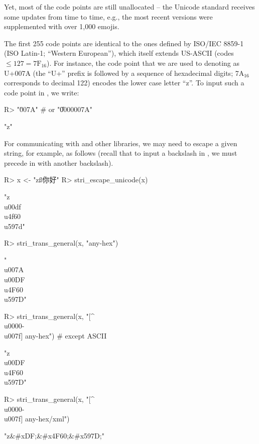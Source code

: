 \documentclass[nojss]{jss}\usepackage[]{graphicx}\usepackage[]{color}
\begin{document}
Yet, most of the code points are still unallocated -- the Unicode
standard receives some updates from time to time, e.g., the
most recent versions
were supplemented with over 1{,}000 emojis.


The first 255 code points are identical to the ones defined
by ISO/IEC 8859-1 (ISO Latin-1;
``Western European''), which itself extends US-ASCII (codes $\le 127=\text{7F}{}_{16}$).
For instance, the code point that we are used to denoting as U+007A
(the ``U+'' prefix is followed by a sequence of hexadecimal digits;
7A${}_{16}$ corresponds to decimal 122) encodes the lower case letter ``z''.
To input such a code point in , we write:

\begin{Schunk}
\begin{Sinput}
R> "\u007A"  # or "\U0000007A"
\end{Sinput}
\begin{Soutput}
[1] "z"
\end{Soutput}
\end{Schunk}


For communicating with  and other libraries,
we may need to escape a given string, for example, as follows
(recall that to input a backslash in ,
we must precede in with another backslash).

\begin{Schunk}
\begin{Sinput}
R> x <- "zß你好"
R> stri_escape_unicode(x)
\end{Sinput}
\begin{Soutput}
[1] "z\\u00df\\u4f60\\u597d"
\end{Soutput}
\begin{Sinput}
R> stri_trans_general(x, "any-hex")
\end{Sinput}
\begin{Soutput}
[1] "\\u007A\\u00DF\\u4F60\\u597D"
\end{Soutput}
\begin{Sinput}
R> stri_trans_general(x, "[^\\u0000-\\u007f] any-hex") # except ASCII
\end{Sinput}
\begin{Soutput}
[1] "z\\u00DF\\u4F60\\u597D"
\end{Soutput}
\begin{Sinput}
R> stri_trans_general(x, "[^\\u0000-\\u007f] any-hex/xml")
\end{Sinput}
\begin{Soutput}
[1] "z&#xDF;&#x4F60;&#x597D;"
\end{Soutput}
\end{Schunk}
\end{document}
